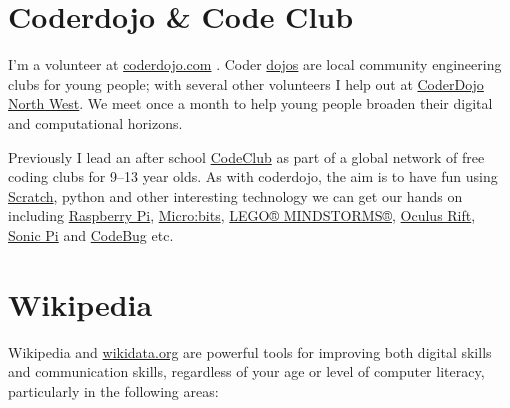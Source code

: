 \documentclass[
  12pt,
]{book}
\begin{document}
\hypertarget{codeclub}{%
\section{Coderdojo \& Code Club}\label{codeclub}}

I'm a volunteer at \href{https://coderdojo.com/}{coderdojo.com} \citep{coderdojo}. Coder \href{https://en.wikipedia.org/wiki/Dojo}{dojos} are local community engineering clubs for young people; with several other volunteers I help out at \href{https://twitter.com/coderdojonw}{CoderDojo North West}. We meet once a month to help young people broaden their digital and computational horizons.

Previously I lead an after school \href{https://codeclub.org}{CodeClub} as part of a global network of free coding clubs for 9--13 year olds. \citep{codeclub} As with coderdojo, the aim is to have fun using \href{https://scratch.mit.edu/}{Scratch}, \citep{Resnick2009} python and other interesting technology we can get our hands on including \href{https://www.raspberrypi.org/}{Raspberry Pi}, \citep{raspberrypi} \href{https://microbit.org/}{Micro:bits}, \citep{Sentance2017} \href{https://www.lego.com/en-gb/themes/mindstorms}{LEGO® MINDSTORMS®}, \citep{Papert1980, Klassner2003} \href{https://www.oculus.com}{Oculus Rift}, \href{https://sonic-pi.net/}{Sonic Pi} \citep{Aaron2016} and \href{http://www.codebug.org.uk/}{CodeBug} etc.

\hypertarget{wikipedia}{%
\section{Wikipedia}\label{wikipedia}}

Wikipedia and \href{https://www.wikidata.org}{wikidata.org} \citep{Vrandecic2014, Turki2019} are powerful tools for improving both digital skills and communication skills, regardless of your age or level of computer literacy, \citep{Proffitt2018, goodfaith, Littlejohn2019} particularly in the following areas:
\end{document}
